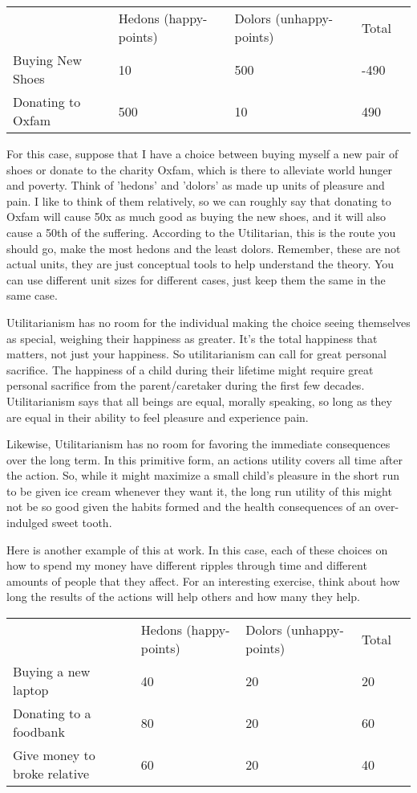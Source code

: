 \begin{tabular}{p{1in}|p{1in}|p{1in}|p{1in}|p{1in}}
&Hedons (happy-points)&Dolors (unhappy-points)&Total\\

Buying New Shoes&10&500&-490\\

Donating to Oxfam&500&10&490
\end{tabular}
For this case, suppose that I have a choice between buying myself a new pair of shoes or donate to the charity Oxfam, which is there to alleviate world hunger and poverty. Think of 'hedons' and 'dolors' as made up units of pleasure and pain. I like to think of them relatively, so we can roughly say that donating to Oxfam will cause 50x as much good as buying the new shoes, and it will also cause a 50th of the suffering. According to the Utilitarian, this is the route you should go, make the most hedons and the least dolors.  Remember, these are not actual units, they are just conceptual tools to help understand the theory. You can use different unit sizes for different cases, just keep them the same in the same case.

Utilitarianism has no room for the individual making the choice seeing themselves as special, weighing their happiness as greater. It’s the total happiness that matters, not just your happiness. So utilitarianism can call for great personal sacrifice. The happiness of a child during their lifetime might require great personal sacrifice from the parent/caretaker during the first few decades. Utilitarianism says that all beings are equal, morally speaking, so long as they are equal in their ability to feel pleasure and experience pain.

Likewise, Utilitarianism has no room for favoring the immediate consequences over the long term. In this primitive form, an actions utility covers all time after the action. So, while it might maximize a small child’s pleasure in the short run to be given ice cream whenever they want it, the long run utility of this might not be so good given the habits formed and the health consequences of an over-indulged sweet tooth.

Here is another example of this at work. In this case, each of these choices on how to spend my money have different ripples through time and different amounts of people that they affect. For an interesting exercise, think about how long the results of the actions will help others and how many they help.
	
\begin{tabular}{p{1in}|p{1in}|p{1in}|p{1in}|p{1in}}
&Hedons (happy-points)&Dolors (unhappy-points)&Total\\
Buying a new laptop&40&20&20\\
Donating to a foodbank&80&20&60\\
Give money to broke relative&60&20&40
\end{tabular}

